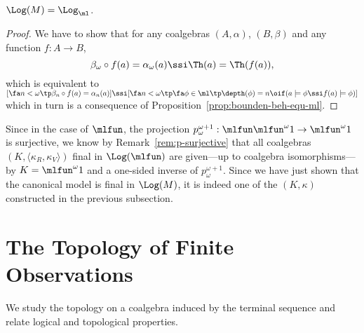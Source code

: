 \documentclass{entcs}
\begin{document}
\begin{prop} $\Log(M) = \Log_\ml$. \end{prop}

\begin{proof}
  We have to show that for any coalgebras $(A,\alpha)$, $(B,\beta)$ and any
  function $f:A\to B$, 
%
$$\beta_\omega\circ f(a)=\alpha_\omega(a) \ssi
  \Th(a)=\Th(f(a)),$$
%
  which is equivalent to $[\fa n<\omega\tp \beta_n\circ
  f(a)=\alpha_n(a)] \ssi [\fa n<\omega\tp \fa\phi\in\ml\tp
  \depth(\phi)=n\oif (a\models\phi\ssi f(a)\models\phi)]$ which in turn
  is a consequence of Proposition~\ref{prop:bounden-beh-equ-ml}.
\end{proof}

Since in the case of $\mlfun$, the projection
$p^{\omega+1}_\omega:\mlfun\mlfun^\omega 1\to \mlfun^\omega 1$ is
surjective, we know by Remark~\ref{rem:p-surjective} that all coalgebras
$(K,\langle\kappa_R,\kappa_V\rangle)$ final in $\Log(\mlfun)$ are
given---up to coalgebra isomorphisms---by $K=\mlfun^\omega 1$ and a
one-sided inverse of $p^{\omega+1}_\omega$. Since we have just shown
that the canonical model is final in $\Log(M)$, it is indeed one of
the $(K,\kappa)$ constructed in the previous subsection.




















\section{The Topology of Finite Observations}\label{section:topo-logical}

We study the topology on a coalgebra induced by the terminal sequence and
relate logical and topological properties.
\end{document}
